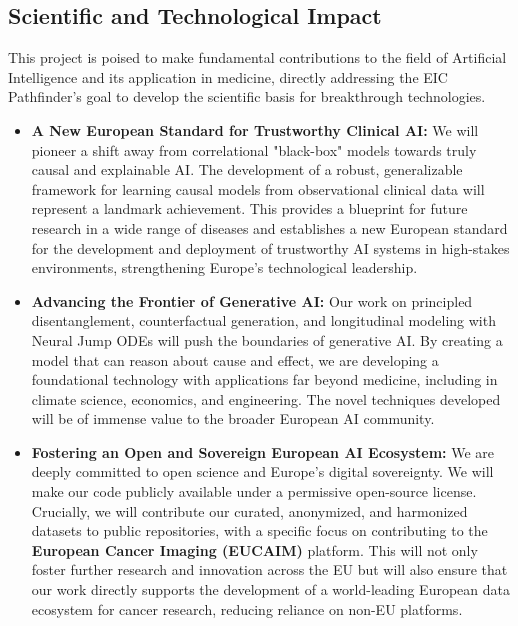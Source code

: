 \documentclass[11pt, a4paper]{article}
\begin{document}
\subsection{Scientific and Technological Impact}
This project is poised to make fundamental contributions to the field of Artificial Intelligence and its application in medicine, directly addressing the EIC Pathfinder's goal to develop the scientific basis for breakthrough technologies.
\begin{itemize}
    \item \textbf{A New European Standard for Trustworthy Clinical AI:} We will pioneer a shift away from correlational "black-box" models towards truly causal and explainable AI. The development of a robust, generalizable framework for learning causal models from observational clinical data will represent a landmark achievement. This provides a blueprint for future research in a wide range of diseases and establishes a new European standard for the development and deployment of trustworthy AI systems in high-stakes environments, strengthening Europe's technological leadership.
    \item \textbf{Advancing the Frontier of Generative AI:} Our work on principled disentanglement, counterfactual generation, and longitudinal modeling with Neural Jump ODEs will push the boundaries of generative AI. By creating a model that can reason about cause and effect, we are developing a foundational technology with applications far beyond medicine, including in climate science, economics, and engineering. The novel techniques developed will be of immense value to the broader European AI community.
    \item \textbf{Fostering an Open and Sovereign European AI Ecosystem:} We are deeply committed to open science and Europe's digital sovereignty. We will make our code publicly available under a permissive open-source license. Crucially, we will contribute our curated, anonymized, and harmonized datasets to public repositories, with a specific focus on contributing to the \textbf{European Cancer Imaging (EUCAIM)} platform. This will not only foster further research and innovation across the EU but will also ensure that our work directly supports the development of a world-leading European data ecosystem for cancer research, reducing reliance on non-EU platforms.
\end{itemize}
\end{document}
